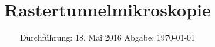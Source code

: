 

\subject{STM}
\title{Rastertunnelmikroskopie}
\date{
  Durchführung: 18. Mai 2016
  \hspace{3em}
  Abgabe: \today
}



\maketitle
\thispagestyle{empty}
\tableofcontents
\newpage






\printbibliography

\appendix
%


